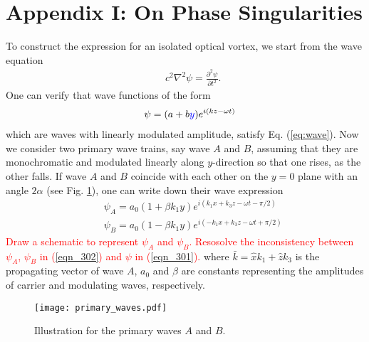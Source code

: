 \section*{Appendix I: On Phase Singularities}

To construct the expression for an isolated optical vortex, we start from the wave equation
\begin{eqnarray}
	&&c^2\nabla^2\psi = \frac{\partial^2 \psi}{\partial t^2}.
	\label{eq:wave}
\end{eqnarray}
One can verify that wave functions of the form
\begin{eqnarray}
	&&\psi = (a + b\textcolor{blue}{y}) e^{i(kz - \omega t)}
	\label{eqn_301}
\end{eqnarray}
which are waves with linearly modulated amplitude, satisfy Eq. (\ref{eq:wave}). 
Now we consider two primary wave trains, say wave $A$ and $B$, assuming that they are monochromatic and modulated linearly along $y$-direction so that one rises, as the other falls. 
If wave $A$ and $B$ coincide with each other on the $y = 0$ plane with an angle $2 \alpha$ (see Fig. \ref{fig:two_primary_waves}), one can write down their wave expression
\begin{eqnarray}
	&&\psi_A = a_0(1 + \beta k_1 y) e^{i(k_1 x + k_3 z - \omega t - \pi/2)}
	\nonumber \\
	&&\psi_B = a_0(1 - \beta k_1 y) e^{i(-k_1 x + k_3 z - \omega t + \pi/2)}
	\label{eqn_302}
\end{eqnarray}
\textcolor{red}{Draw a schematic to represent $\psi_A$ and $\psi_B$.
	Resosolve the inconsistency between $\psi_A$, $\psi_B$ in (\ref{eqn_302}) and $\psi$ in (\ref{eqn_301}).}
where $\bar{k} = \hat{x} k_1 + \hat{z} k_3$ is the propagating vector of wave $A$, 
$a_0$ and $\beta$ are constants representing the amplitudes of carrier and modulating waves, respectively.

\begin{figure}[h]
	\centering
	\texttt{[image: primary\_waves.pdf]}
	\caption{Illustration for the primary waves $A$ and $B$.}
	\label{fig:two_primary_waves}
\end{figure}

